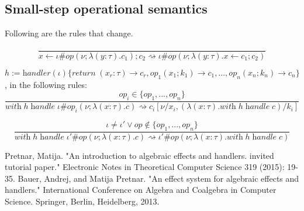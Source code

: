 \documentclass[12pt]{article}
\newcommand\eff[0]{\varepsilon}
\newcommand\eop[0]{\textit{op}}
\newcommand\inst[0]{\iota}
\newcommand\type[0]{\tau}
\newcommand\val[0]{\nu}
\newcommand\vabs[3]{\lambda(#1 : #2) . #3}
\newcommand\vhandleri[2]{\textit{handler} (#1) \{#2\}}
\newcommand\comp[0]{c}
\newcommand\copi[6]{#1 \# #2(#3 ; \lambda (#4:#5) . #6)}
\newcommand\cnew[1]{\textit{new} \; #1}
\newcommand\cdo[3]{#1 \leftarrow #2 ; #3}
\newcommand\chandle[2]{\textit{with} \; #1 \; \textit{handle} \; #2}
\begin{document}
\subsection{Small-step operational semantics}

Following are the rules that change.

\[\frac{
}{
	\cdo{x}{\copi{\inst}{\eop}{\val}{y}{\type}{\comp_1}}{\comp_2} \rightsquigarrow \copi{\inst}{\eop}{\val}{y}{\type}{\cdo{x}{\comp_1}{\comp_2}}
}\]

\vspace{20pt}
$h := \vhandleri{\inst}{
		\textit{return} \; (x_r:\type) \rightarrow \comp_r,
		\eop_1 (  x_1 ; k_1 ) \rightarrow \comp_1,
		...,
		\eop_n ( x_n ; k_n ) \rightarrow \comp_n
	}$, in the following rules:\\
	
\vspace{20pt}
\[\frac{
	\eop_i \in \{ \eop_1, ..., \eop_n \}
}{
	\chandle{h}{\copi{\inst}{\eop_i}{\val}{x}{\type}{\comp}} \rightsquigarrow \comp_i[\val / x_i, (\vabs{x}{\type}{\chandle{h}{\comp}}) / k_i]
}\]

\[\frac{
	 \inst \neq \inst' \vee \eop \notin \{ \eop_1, ..., \eop_n \}
}{
	\chandle{h}{\copi{\inst'}{\eop}{\val}{x}{\type}{\comp}} \rightsquigarrow \copi{\inst'}{\eop}{\val}{x}{\type}{\chandle{h}{\comp}}
}\]

\iffalse
\newpage
\section{Algebraic effects with dynamic instances}

In the syntax we have to add a computation to dynamically create instances of a certain effect.
\begin{align*}
	\comp \Coloneqq	& ...							\tag{computations} \\
				& \cnew{\eff}					\tag{instance creation} \\
\end{align*}
We also have to change the types of the instances, functions and handlers. We cannot simply annotate these with the instance, since they are not statically known.
But annotating with just the effect is too general, since there can be multiple instances of the same effect and we'd like to be more precise with our types.
\fi
\begin{thebibliography}{9}
Pretnar, Matija. "An introduction to algebraic effects and handlers. invited tutorial paper." Electronic Notes in Theoretical Computer Science 319 (2015): 19-35.
Bauer, Andrej, and Matija Pretnar. "An effect system for algebraic effects and handlers." International Conference on Algebra and Coalgebra in Computer Science. Springer, Berlin, Heidelberg, 2013.
\end{thebibliography}
\end{document}
